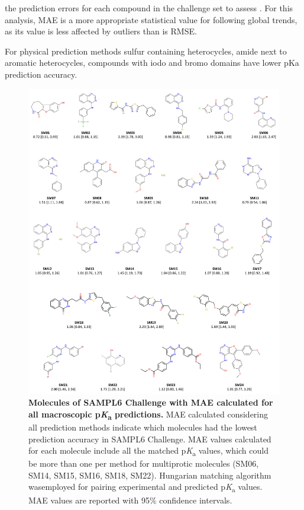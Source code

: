 \documentclass[9pt,lineno,final]{elife}
\newcommand{\pKa}{p\textit{K}\textsubscript{a}}
\begin{document}
the prediction errors for each compound in the challenge set to assess . 
For this analysis, MAE is a more appropriate statistical value for following global trends, as its value is less affected by outliers than is RMSE.

For physical prediction methods sulfur containing heterocycles, amide next to aromatic heterocycles, compounds with iodo and bromo domains have lower pKa prediction accuracy.

\begin{figure}
\begin{center}
\includegraphics[width=0.95\linewidth]{figures/molecules_with_MAE_of_all_methods.pdf}
\caption{{\bf Molecules of SAMPL6 Challenge with MAE calculated for all macroscopic \pKa{} predictions.} MAE calculated considering all prediction methods indicate which molecules had the lowest prediction accuracy in SAMPL6 Challenge. MAE values calculated for each molecule include all the matched \pKa{} values, which could be more than one per method for multiprotic molecules (SM06, SM14, SM15, SM16, SM18, SM22). Hungarian matching algorithm wasemployed for pairing experimental and predicted \pKa{} values. MAE values are reported with 95\% confidence intervals.
}
\label{fig:molecules_with_MAE_of_all_methods}
\end{center}
\end{figure}
\end{document}
